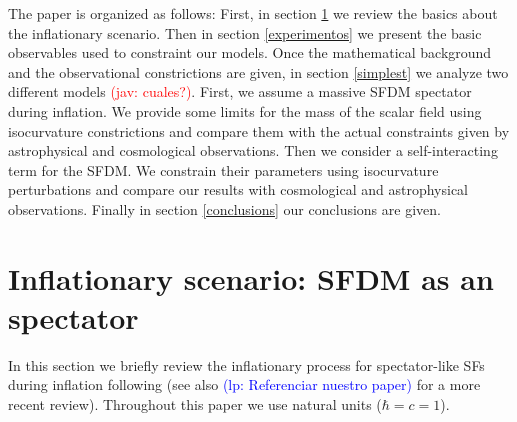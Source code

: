 \documentclass[amssymb,twocolumn,prd,nofootinbib,showpacs]{revtex4-1}
\newcommand{\jav}[1]{\textcolor{red}{(jav: #1)}}
\newcommand{\lp}[1]{\textcolor{blue}{(lp: #1)}}
\begin{document}
The paper is organized as follows: First, in section \ref{Generalities} we review the basics about the inflationary scenario. 
Then in section \ref{experimentos} we present the basic  observables used to constraint our models. 
Once the mathematical background and the observational constrictions are given, in section \ref{simplest} we 
analyze two different models \jav{cuales?}. 
First, we assume a massive SFDM spectator during inflation. We provide some limits for the  
mass of the scalar field using isocurvature constrictions and compare them with the actual constraints given by 
astrophysical and cosmological observations. 
 Then we consider a self-interacting term for the SFDM. We constrain their parameters using 
 isocurvature perturbations and compare our results with cosmological and astrophysical 
 observations. Finally in section \ref{conclusions} our conclusions are given.      

\section{Inflationary scenario: SFDM as an spectator}\label{Generalities}


In this section we briefly review the inflationary process for spectator-like SFs during 
inflation following \cite{twofields} (see also \lp{Referenciar nuestro paper} for a more recent review). 
Throughout this paper we use natural units ($\hbar=c=1$).
\end{document}
